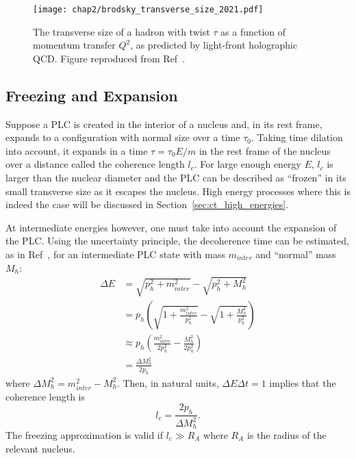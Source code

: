 \begin{figure}[!h]
    \centering
    \texttt{[image: chap2/brodsky\_transverse\_size\_2021.pdf]}
    \caption[The transverse size of a hadron with twist $\tau$ as a function of
            momentum transfer $Q^2$, as predicted by light-front holographic
            QCD.]{
            The transverse size of a hadron with twist $\tau$ as a function of
            momentum transfer $Q^2$, as predicted by light-front holographic
            QCD.
            Figure reproduced from Ref~\cite{Brodsky_2021}.
            }
    \label{fig:brodsky_transverse_size_2021}
\end{figure}




\subsection{Freezing and Expansion}
Suppose a PLC is created in the interior of a nucleus and, in its rest frame,
expands to a configuration with normal size over a time $\tau_0$.
Taking time dilation into account, it expands in a time $\tau=\tau_0E/m$ in the
rest frame of the nucleus over a distance called the coherence length $l_c$.
For large enough energy $E$, $l_c$ is larger than the nuclear diameter and the
PLC can be described as ``frozen'' in its small transverse size as it escapes
the nucleus.
High energy processes where this is indeed the case will be discussed in
Section~\ref{sec:ct_high_energies}.


At intermediate energies however, one must take into account the expansion of
the PLC.
Using the uncertainty principle, the decoherence time can be
estimated, as in Ref~\cite{Farrar_1988}, for an intermediate PLC state with mass
$m_{inter}$ and ``normal'' mass $M_h$:
\begin{align}
    \Delta E &= \sqrt{p_h^2 + m_{inter}^2} - \sqrt{p_h^2 + M_h^2} \\
             &= p_h \left( \sqrt{1+\frac{m_{inter}^2}{p_h^2}} -
                           \sqrt{1+\frac{M_h^2}{p_h^2}} \right) \\
             &\approx p_h \left( \frac{m_{inter}^2}{2p_h^2} - \frac{M_h^2}{2p_h^2} \right) \\
             &= \frac{\Delta M_h^2}{2p_h}
\end{align}
where $\Delta M_h^2 = m_{inter}^2 - M_h^2$.
Then, in natural units, $\Delta E \Delta t = 1$ implies that the coherence
length is
\begin{equation}
    l_c = \frac{2p_h}{\Delta M_h^2}.
\end{equation}
The freezing approximation is valid if $l_c \gg R_A$ where $R_A$ is the radius of
the relevant nucleus.


